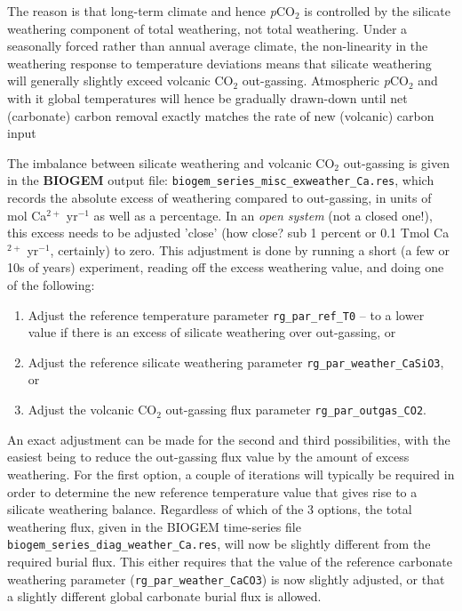 The reason is that long-term climate and hence \textit{p}CO${_2}$ is controlled by the silicate weathering component of total weathering, not total weathering. Under a seasonally forced rather than annual average climate, the non-linearity in the weathering response to temperature deviations means that silicate weathering will generally slightly exceed volcanic CO$_{2}$ out-gassing. Atmospheric \textit{p}CO${_2}$ and with it  global temperatures will hence be gradually drawn-down until net (carbonate) carbon removal exactly matches the rate of new (volcanic) carbon input

The imbalance between silicate weathering and volcanic CO$_{2}$ out-gassing is given in the \textbf{BIOGEM} output file: \texttt{biogem\_series\_misc\_exweather\_Ca.res}, which records the absolute excess of weathering compared to out-gassing, in units of mol Ca$^{2+}$ yr$^{-1}$ as well as a percentage. In an \textit{open system} (not a closed one!), this excess needs to be adjusted 'close' (how close? sub 1 percent or 0.1 Tmol Ca$^{2+}$ yr$^{-1}$, certainly) to zero. This adjustment is done by running a short (a few or 10s of years) experiment, reading off the excess weathering value, and doing one of the following:

\begin{enumerate}
\vspace{1mm}
\item Adjust the reference temperature parameter \texttt{rg\_par\_ref\_T0} -- to a lower value if there is an excess of silicate weathering over out-gassing, or
\vspace{1mm}
\item Adjust the reference silicate weathering parameter \texttt{rg\_par\_weather\_CaSiO3}, or
\vspace{1mm}
\item Adjust the volcanic CO$_{2}$ out-gassing flux parameter \texttt{rg\_par\_outgas\_CO2}.
\end{enumerate}
\vspace{1mm}

An exact adjustment can be made for the second and third possibilities, with the easiest being to reduce the out-gassing flux value by the amount of excess weathering. For the first option, a couple of iterations will typically be required in order to determine the new reference temperature value that gives rise to a silicate weathering balance. Regardless of which of the 3 options, the total weathering flux, given in the BIOGEM time-series file \texttt{biogem\_series\_diag\_weather\_Ca.res}, will now be slightly different from the required burial flux. This either requires that the value of the reference carbonate weathering parameter (\texttt{rg\_par\_weather\_CaCO3}) is now slightly adjusted, or that a slightly different global carbonate burial flux is allowed.

